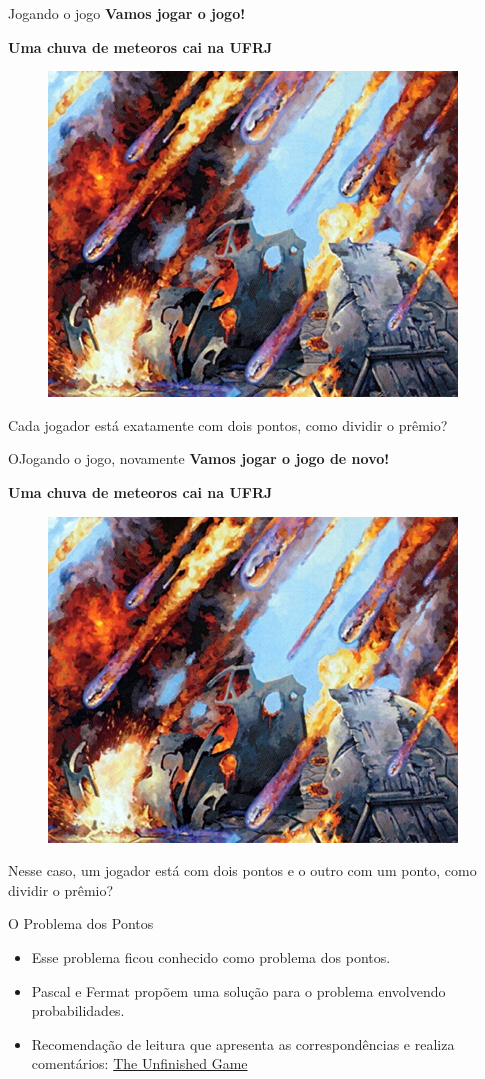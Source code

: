 \begin{frame}{Jogando o jogo}
    \textbf{Vamos jogar o jogo!}
    
    \pause

    \textbf{Uma chuva de meteoros cai na UFRJ}
    \begin{figure}
        \centering
        \includegraphics[width=0.5\linewidth]{figures/molten_rain.jpg}
    \end{figure}
    \pause
    Cada jogador está exatamente com dois pontos, como dividir o prêmio?
\end{frame}

\begin{frame}{OJogando o jogo, novamente}
    \textbf{Vamos jogar o jogo de novo!}

    \pause

    \textbf{Uma chuva de meteoros cai na UFRJ}
    \begin{figure}
        \centering
        \includegraphics[width=0.5\linewidth]{figures/molten_rain.jpg}
    \end{figure}
    \pause
    Nesse caso, um jogador está com dois pontos e o outro com um ponto, como dividir o prêmio?
\end{frame}

\begin{frame}{O Problema dos Pontos}
    \begin{itemize}
        \item Esse problema ficou conhecido como problema dos pontos. 
        \pause
        \item Pascal e Fermat propõem uma solução para o problema envolvendo probabilidades. 
        \pause
        \item Recomendação de leitura que apresenta as correspondências e realiza comentários:  \href{https://archive.org/details/unfinishedgamepa0000devl}{The Unfinished Game} 
    \end{itemize}
\end{frame}


